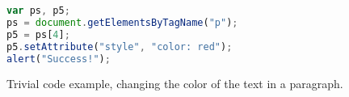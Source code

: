 \lstset{numbers=left,xleftmargin=2em,frame=single,framexleftmargin=1.5em}
\begin{figure}[ht]
\begin{lstlisting}[language=javascript]
var ps, p5;
ps = document.getElementsByTagName("p");
p5 = ps[4];
p5.setAttribute("style", "color: red");
alert("Success!");
\end{lstlisting}
\caption{Trivial \JS code example, changing the color of the text in a paragraph.}
\label{fig:trivial-js}
\end{figure}
